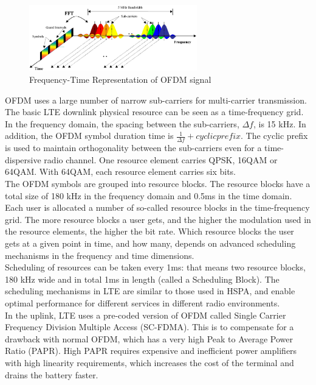 \begin{figure}[htbp]
    \centering
    \includegraphics[width=0.65\textwidth]{./figures/ofdm_frequency}
    \caption{ Frequency-Time Representation of OFDM signal
    \label{fig:ofdmfreq}}
\end{figure}

OFDM uses a large number of narrow sub-carriers for multi-carrier transmission.
The basic LTE downlink physical resource can be seen as a time-frequency grid.
In the frequency domain, the spacing between the sub-carriers, $\Delta f$, is 15
kHz. In addition, the OFDM symbol duration time is $\frac{1}{\Delta f} + cyclic prefix$.
The cyclic prefix is used to maintain orthogonality between the sub-carriers even
for a time-dispersive radio channel. One resource element carries QPSK, 16QAM or
64QAM. With 64QAM, each resource element carries six bits.\\

The OFDM symbols are grouped into resource blocks. The resource blocks have a
total size of 180 kHz in the frequency domain and 0.5ms in the time domain. Each
user is allocated a number of so-called resource blocks in the time-frequency grid.
The more resource blocks a user gets, and the higher the modulation used in the
resource elements, the higher the bit rate. Which resource blocks the user gets
at a given point in time, and how many, depends on advanced scheduling mechanisms
in the frequency and time dimensions.\\

Scheduling of resources can be taken every 1ms: that means two resource blocks,
180 kHz wide and in total 1ms in length (called a Scheduling Block). The scheduling
mechanisms in LTE are similar to those used in HSPA, and enable optimal performance
for different services in different radio environments.\\

In the uplink, LTE uses a pre-coded version of OFDM called Single Carrier Frequency
Division Multiple Access (SC-FDMA). This is to compensate for a drawback with normal
OFDM, which has a very high Peak to Average Power Ratio (PAPR). High PAPR requires
expensive and inefficient power amplifiers with high linearity requirements, which
increases the cost of the terminal and drains the battery faster.\\

